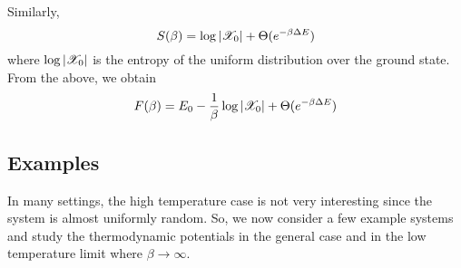 \documentclass[letterpaper,english,10pt]{article}
\begin{document}
Similarly,
\begin{equation}
S(\beta) = \log |\mathscr{X}_0| + \Theta(e^{-\beta \Delta E})
\end{equation}
where $\log |\mathscr{X}_0|$ is the entropy of the uniform distribution over the ground state. From the above, we obtain
\begin{equation}
F(\beta) = E_0 - \frac{1}{\beta} \log |\mathscr{X}_0| + \Theta(e^{-\beta \Delta E})
\end{equation}
\subsection{Examples}
In many settings, the high temperature case is not very interesting since the system is almost uniformly random. So, we now consider a few example systems and study the thermodynamic potentials in the general case and in the low temperature limit where $\beta \rightarrow \infty$.
\end{document}
